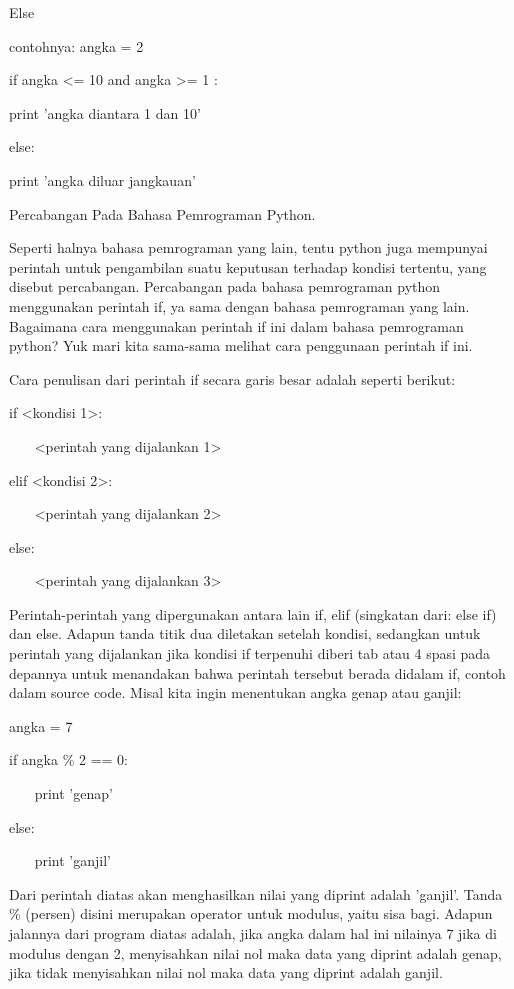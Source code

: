 Else 
 

contohnya:
angka = 2 
 

if angka <= 10 and angka >= 1 : 
 

        print 'angka diantara 1 dan 10' 
 

else: 
 

        print 'angka diluar jangkauan' 

 
Percabangan Pada Bahasa Pemrograman Python. 

 
Seperti halnya bahasa pemrograman yang lain, tentu python juga mempunyai perintah untuk pengambilan suatu keputusan terhadap kondisi tertentu, yang disebut percabangan. Percabangan pada bahasa pemrograman python menggunakan perintah   if, ya sama dengan bahasa pemrograman yang lain. Bagaimana cara menggunakan perintah   if   ini dalam bahasa pemrograman python? Yuk mari kita sama-sama melihat cara penggunaan perintah   if   ini. 

 
Cara penulisan dari perintah if secara garis besar adalah seperti berikut: 
 
if <kondisi 1>: 

 
~~~ <perintah yang dijalankan 1> 

 
elif <kondisi 2>: 

 
~~~ <perintah yang dijalankan 2> 

 
else: 

 
~~~ <perintah yang dijalankan 3> 

 
Perintah-perintah yang dipergunakan antara lain   if,   elif   (singkatan dari:   else if) dan   else. Adapun tanda titik dua diletakan setelah kondisi, sedangkan untuk perintah yang dijalankan jika kondisi if terpenuhi diberi   tab   atau   4 spasi   pada depannya untuk menandakan bahwa perintah tersebut berada didalam if, contoh dalam source code. Misal kita ingin menentukan angka genap atau ganjil: 

 
angka = 7 

 
if angka    \%   2 == 0: 

 
~~~ print 'genap' 

 
else: 

 
~~~ print 'ganjil' 

 
Dari perintah diatas akan menghasilkan nilai yang diprint adalah 'ganjil'. Tanda      \%     (persen) disini merupakan operator untuk modulus, yaitu sisa bagi. Adapun jalannya dari program diatas adalah, jika angka dalam hal ini nilainya 7 jika di modulus dengan 2, menyisahkan nilai nol maka data yang diprint adalah genap, jika tidak menyisahkan nilai nol maka data yang diprint adalah ganjil. 

